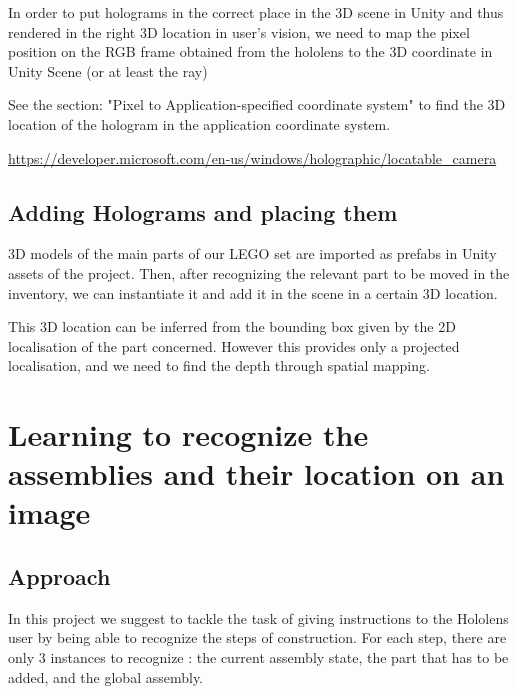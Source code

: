 \documentclass[a4paper,10pt]{article}
\begin{document}
In order to put holograms in the correct place in the 3D scene in Unity and thus rendered in the right 3D location in user's vision, we need to map the pixel position on the RGB frame obtained from the hololens to the 3D coordinate in Unity Scene (or at least the ray)

See the section: "Pixel to Application-specified coordinate system" to find the 3D location of the hologram in the application coordinate system.

\url{https://developer.microsoft.com/en-us/windows/holographic/locatable_camera}

\subsection{Adding Holograms and placing them}
3D models of the main parts of our LEGO set are imported as prefabs in Unity assets of the project. Then, after recognizing the relevant part to be moved in the inventory, we can instantiate it and add it in the scene in a certain 3D location.

This 3D location can be inferred from the bounding box given by the 2D localisation of the part concerned. However this provides only a projected localisation, and we need to find the depth through spatial mapping.

\section{Learning to recognize the assemblies and their location on an image}

\subsection{Approach}

In this project we suggest to tackle the task of giving instructions to the Hololens user by being able to 
recognize the steps of construction. For each step, there are only 3 instances to recognize : the current 
assembly state, the part that has to be added, and the global assembly.



\end{document}
